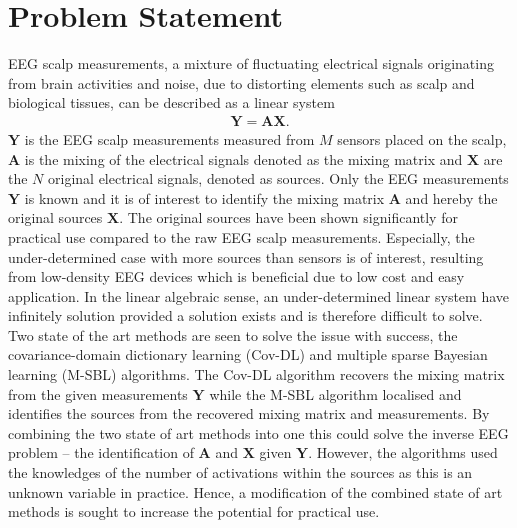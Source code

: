 \chapter{Problem Statement}\label{ch:problemstatement}
EEG scalp measurements, a mixture of fluctuating electrical signals originating from brain activities and noise, due to distorting elements such as scalp and biological tissues, can be described as a linear system
\begin{align*}
\mathbf{Y} = \mathbf{AX}.
\end{align*}
$\mathbf{Y}$ is the EEG scalp measurements measured from $M$ sensors placed on the scalp, $\mathbf{A}$ is the mixing of the electrical signals denoted as the mixing matrix and $\mathbf{X}$ are the $N$ original electrical signals, denoted as sources. 
Only the EEG measurements $\mathbf{Y}$ is known and it is of interest to identify the mixing matrix $\mathbf{A}$ and hereby the original sources $\mathbf{X}$. The original sources have been shown significantly for practical use compared to the raw EEG scalp measurements. 
Especially, the under-determined case with more sources than sensors is of interest, resulting from low-density EEG devices which is beneficial due to low cost and easy application. 
In the linear algebraic sense, an under-determined linear system have infinitely solution provided a solution exists and is therefore difficult to solve.
Two state of the art methods are seen to solve the issue with success, the covariance-domain dictionary learning (Cov-DL) and multiple sparse Bayesian learning (M-SBL) algorithms. 
The Cov-DL algorithm recovers the mixing matrix from the given measurements $\mathbf{Y}$ while the M-SBL algorithm localised and identifies the sources from the recovered mixing matrix and measurements. 
By combining the two state of art methods into one this could solve the inverse EEG problem -- the identification of $\mathbf{A}$ and $\mathbf{X}$ given $\mathbf{Y}$.
However, the algorithms used the knowledges of the number of activations within the sources as this is an unknown variable in practice. Hence, a modification of the combined state of art methods is sought to increase the potential for practical use.


